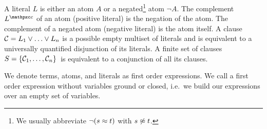 
\begin{definition}\label{def:literals}
A {\myem literal} $L$ is either an atom $A$ or a negated\footnote{
We usually abbreviate $\lnot(s\approx t)$ with $s\not\approx t$.
} 
atom $\lnot A$.
%
The {\myem complement } $L^\mcc$ of an atom (positive literal) is the negation of the atom.
The complement of a negated atom (negative literal) is the atom itself. 
%
A {\myem clause}\ \ ${\mathcal C} = L_1\lor\ldots\lor L_n$  is a possible empty multiset of literals 
and is equivalent to a universally quantified disjunction of its literals.
%
A finite {\myem set of clauses} $S=\{ {\mathcal C}_1,\ldots,{\mathcal C}_n \}$ is equivalent to a conjunction of all its clauses.
%
\end{definition}

\begin{definition}
	We denote
	terms, atoms, and literals as first order expressions.
	We call a first order expression without variables {\myem ground} or {\myem closed}, 
	i.e.~we build our expressions over an empty set of variables.
\end{definition}

